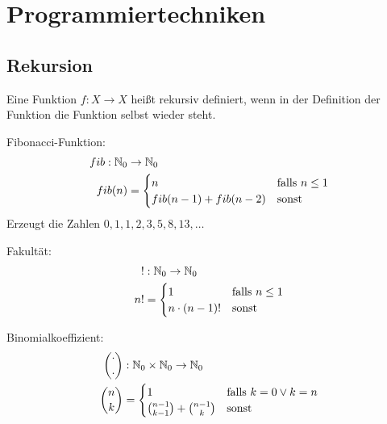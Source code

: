 \chapter{Programmiertechniken}
\section{Rekursion}

\begin{definition}
    Eine Funktion $f: X \rightarrow X$ heißt rekursiv definiert,
    wenn in der Definition der Funktion die Funktion selbst wieder
    steht.
\end{definition}

\begin{beispiel}
    \begin{bspenum}
        \item Fibonacci-Funktion:
                \begin{align*}
                    fib: \mathbb{N}_0 &\rightarrow \mathbb{N}_0\\
                    fib(n) &= \begin{cases}
                            n                   &\text{falls } n \leq 1\\
                            fib(n-1) + fib(n-2) &\text{sonst}
                        \end{cases}
                \end{align*}
              Erzeugt die Zahlen $0, 1, 1, 2, 3, 5, 8, 13, \dots$
        \item Fakultät:
                \begin{align*}
                    !  &: \mathbb{N}_0 \rightarrow \mathbb{N}_0\\
                    n! &= \begin{cases}
                            1              &\text{falls } n \leq 1\\
                            n\cdot (n-1)!  &\text{sonst}
                        \end{cases}
                \end{align*}
        \item \label{bsp:binomialkoeffizient} Binomialkoeffizient:
                \begin{align*}
                    \binom{\cdot}{\cdot}    &: \mathbb{N}_0 \times \mathbb{N}_0 \rightarrow \mathbb{N}_0\\
                            \binom{n}{k}    &= \begin{cases}
                        1                               &\text{falls } k=0 \lor k = n\\
                        \binom{n-1}{k-1}+\binom{n-1}{k} &\text{sonst}
                        \end{cases}
                \end{align*}
    \end{bspenum}
\end{beispiel}


